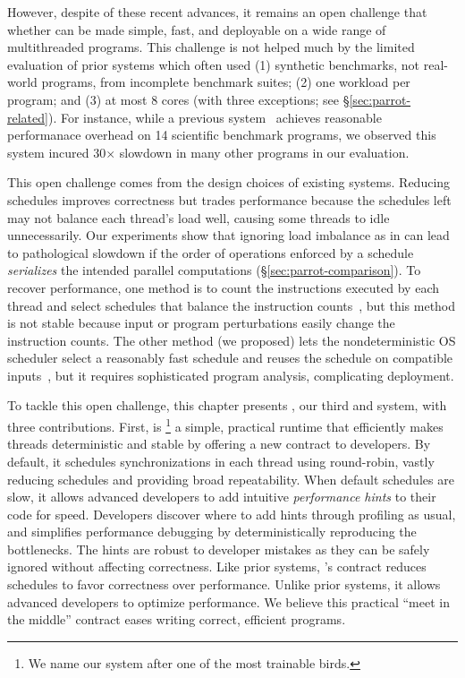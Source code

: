 However, despite of these recent advances, it remains an
open challenge that whether \smt can be made simple, fast, and deployable on a
wide range of multithreaded programs.  
This challenge is not helped much by the limited
evaluation of prior systems which often used (1) synthetic benchmarks, not
real-world programs, from incomplete benchmark suites; (2) one workload
per program; and (3) at most 8 cores (with three exceptions; see
\S\ref{sec:parrot-related}). For instance, while a previous
system~\cite{dthreads:sosp11} achieves reasonable performanace overhead on 14
scientific benchmark programs, we observed
this system incured 30$\times$ slowdown in many other programs in our evaluation.

This open challenge comes from the design choices of existing \smt systems. 
Reducing schedules improves correctness
but trades performance because the schedules left may not balance each
thread's load well, causing some threads to idle unnecessarily.  Our
experiments show that ignoring load imbalance as in \dthreads
can lead to pathological
slowdown if the order of operations enforced by a schedule
\emph{serializes} the intended parallel computations
(\S\ref{sec:parrot-comparison}).  To recover performance, one method is to count
the instructions executed by each thread and select schedules that balance
the instruction counts~\cite{kendo:asplos09, coredet:asplos10,
  dmp:asplos09}, but this method is not stable because input or program
perturbations easily change the instruction counts.  The other method (we
proposed)
lets the nondeterministic OS scheduler select
a reasonably fast schedule and reuses the schedule on
compatible inputs~\cite{cui:tern:osdi10,peregrine:sosp11}, but it
requires sophisticated program analysis, complicating deployment.



To tackle this open challenge, this chapter presents \parrot, our third \smt and
\dmt system, with three contributions.
First, \parrot is \footnote{We name our system after one of the most
  trainable birds.} a simple, practical runtime that efficiently makes
threads deterministic and stable by offering a new contract to developers.
By default, it schedules synchronizations in each thread using
round-robin, vastly reducing schedules and providing broad repeatability.
When default schedules are slow, it allows advanced developers to add
intuitive \emph{performance hints} to their code for speed.  Developers discover
where to add hints through profiling as usual, and \parrot simplifies
performance debugging by deterministically reproducing the bottlenecks.
The hints are robust to developer mistakes as they can be safely ignored
without affecting correctness. Like prior systems, \parrot's contract reduces
schedules to favor correctness over performance.  Unlike prior systems, it
allows advanced developers
to optimize performance.  We believe this practical ``meet in the
middle'' contract eases writing correct, efficient programs.


